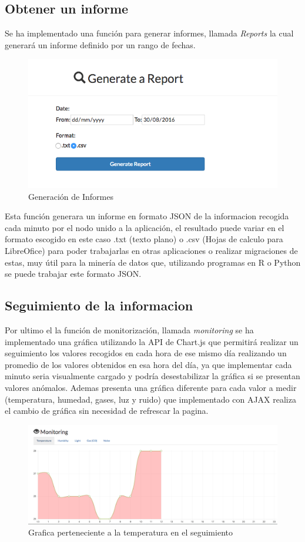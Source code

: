\subsection{Obtener un informe}

Se ha implementado una función para generar informes, llamada \textit{Reports} la cual generará un informe definido por un rango de fechas.

\begin{figure}[!h]
	\centering
	\includegraphics[width=0.8\linewidth]{figuras/nodereports2}
	\caption{Generación de Informes}
	\label{fig:nodereport}
\end{figure}

Esta función generara un informe en formato JSON de la informacion recogida cada minuto por el nodo unido a la aplicación, el resultado puede variar en el formato escogido en este caso .txt (texto plano) o .csv (Hojas de calculo para LibreOfice) para poder trabajarlas en otras aplicaciones o realizar migraciones de estas, muy útil para la minería de datos que, utilizando programas en R o Python se puede trabajar este formato JSON.

\subsection{Seguimiento de la informacion}

Por ultimo el la función de monitorización, llamada \textit{monitoring} se ha implementado una gráfica utilizando la API de Chart.js que permitirá realizar un seguimiento los valores recogidos en cada hora de ese mismo día realizando un promedio de los valores obtenidos en esa hora del día, ya que implementar cada minuto seria visualmente cargado y podría desestabilizar la gráfica si se presentan valores anómalos. 
Ademas presenta una gráfica diferente para cada valor a medir (temperatura, humedad, gases, luz y ruido) que implementado con AJAX realiza el cambio de gráfica sin necesidad de refrescar la pagina.

\begin{figure}[!h]
	\centering
	\includegraphics[width=0.9\linewidth]{figuras/nodereports3}
	\caption{Grafica perteneciente a la temperatura en el seguimiento}
	\label{fig:nodereport}
\end{figure}


